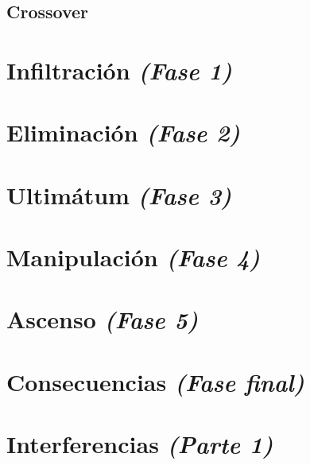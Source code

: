 \documentclass[11pt]{book}
\begin{document}
\begin{appendices}
\renewcommand{\thechapter}{\arabic{chapter}}
\chapter{Crossover}

\end{appendices}

\chapter{Infiltración \emph{\mdseries(Fase 1)}}


\chapter{Eliminación \emph{\mdseries(Fase 2)}}


\chapter{Ultimátum \emph{\mdseries(Fase 3)}}


\chapter{Manipulación \emph{\mdseries(Fase 4)}}


\chapter{Ascenso \emph{\mdseries(Fase 5)}}


\chapter{Consecuencias \emph{\mdseries(Fase final)}}


\chapter{Interferencias \emph{\mdseries(Parte 1)}}

\end{document}
